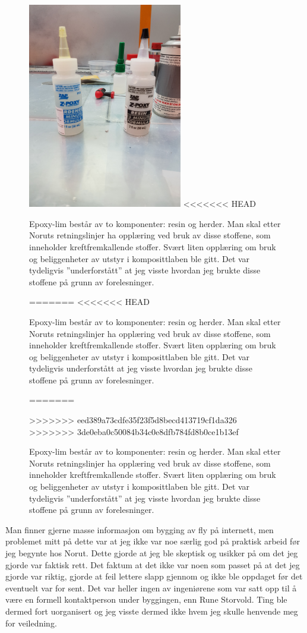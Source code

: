 \documentclass[12pt, a4paper]{article}
\begin{document}
\begin{figure}[h]
	\centering
	\includegraphics[width = .6\textwidth, height=9cm]{bilder/epoxyresin.jpg}
<<<<<<< HEAD
	\caption[Epoxy og herder]{Epoxy-lim består av to komponenter: resin og herder. Man skal etter Noruts retningslinjer ha opplæring ved bruk av disse stoffene, som inneholder kreftfremkallende stoffer. Svært liten opplæring om bruk og beliggenheter av utstyr i komposittlaben ble gitt. Det var tydeligvis ''underforstått'' at jeg visste hvordan jeg brukte disse stoffene på grunn av forelesninger.}
=======
<<<<<<< HEAD
	\caption{Epoxy-lim består av to komponenter: resin og herder. Man skal etter Noruts retningslinjer ha opplæring ved bruk av disse stoffene, som inneholder kreftfremkallende stoffer. Svært liten opplæring om bruk og beliggenheter av utstyr i komposittlaben ble gitt. Det var tydeligvis underforstått at jeg visste hvordan jeg brukte disse stoffene på grunn av forelesninger.}
=======
	\caption[Epoxy og herder]{Epoxy-lim består av to komponenter: resin og herder. Man skal etter Noruts retningslinjer ha opplæring ved bruk av disse stoffene, som inneholder kreftfremkallende stoffer. Svært liten opplæring om bruk og beliggenheter av utstyr i komposittlaben ble gitt. Det var tydeligvis ''underforstått'' at jeg visste hvordan jeg brukte disse stoffene på grunn av forelesninger.}
>>>>>>> eed389a73cdfe35f23f5d8becd413719cf1da326
>>>>>>> 3de0eba0c50084b34c0e8dfb784fd8b0ce1b13ef
\end{figure}

Man finner gjerne masse informasjon om bygging av fly på internett, men problemet mitt på dette var at jeg ikke var noe særlig god på praktisk arbeid før jeg begynte hos Norut. Dette gjorde at jeg ble skeptisk og usikker på om det jeg gjorde var faktisk rett. Det faktum at det ikke var noen som passet på at det jeg gjorde var riktig, gjorde at feil lettere slapp gjennom og ikke ble oppdaget før det eventuelt var for sent. Det var heller ingen av ingeniørene som var satt opp til å være en formell kontaktperson under byggingen, enn Rune Storvold. Ting ble dermed fort uorganisert og jeg visste dermed ikke hvem jeg skulle henvende meg for veiledning. \\
\end{document}

